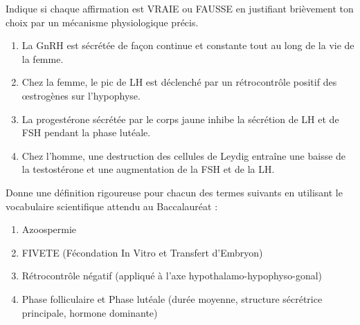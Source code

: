 \documentclass[11pt]{article}
\newcommand{\cle}[1]{{\popxbold\color{popdark}#1}}
\begin{document}
\begin{exercice}
Indique si chaque affirmation est VRAIE ou FAUSSE en justifiant brièvement ton choix par un mécanisme physiologique précis.
\begin{enumerate}
    \item La GnRH est sécrétée de façon continue et constante tout au long de la vie de la femme.
    \item Chez la femme, le pic de LH est déclenché par un rétrocontrôle positif des œstrogènes sur l'hypophyse.
    \item La progestérone sécrétée par le corps jaune inhibe la sécrétion de LH et de FSH pendant la phase lutéale.
    \item Chez l'homme, une destruction des cellules de Leydig entraîne une baisse de la testostérone et une augmentation de la FSH et de la LH.
\end{enumerate}
\end{exercice}

\begin{exercice}
Donne une définition rigoureuse pour chacun des termes suivants en utilisant le vocabulaire scientifique attendu au Baccalauréat :
\begin{enumerate}
    \item \cle{Azoospermie}
    \item \cle{FIVETE} (Fécondation In Vitro et Transfert d'Embryon)
    \item \cle{Rétrocontrôle négatif} (appliqué à l'axe hypothalamo-hypophyso-gonal)
    \item \cle{Phase folliculaire} et \cle{Phase lutéale} (durée moyenne, structure sécrétrice principale, hormone dominante)
\end{enumerate}
\end{exercice}
\end{document}
